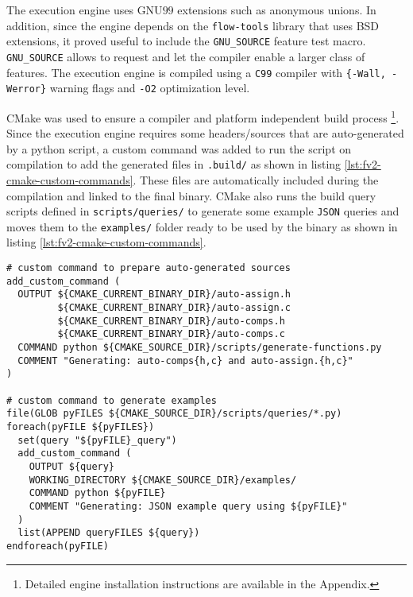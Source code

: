 The execution engine uses GNU$99$ extensions such as anonymous unions.  In
addition, since the engine depends on the \texttt{flow-tools} library that
uses BSD  extensions, it proved
useful to include the \texttt{GNU\_SOURCE} feature test macro.
\texttt{GNU\_SOURCE} allows to request and let the compiler enable a larger
class of features. The execution engine is compiled using a \texttt{C99}
compiler with \texttt{\{-Wall, -Werror\}} warning flags and \texttt{-O2}
optimization level.

CMake \cite{masteringcmake:2008} was used to ensure a compiler and platform
independent build process \footnote{Detailed engine installation instructions
are available in the Appendix.}.  Since the execution engine requires some
headers/sources that are auto-generated by a python script, a custom command
was added to run the script on compilation to add the generated files
 in \texttt{.build/} as shown in listing
\ref{lst:fv2-cmake-custom-commands}. These files are automatically included
during the compilation and linked to the final binary.  CMake also runs the
build query scripts defined in \texttt{scripts/queries/} to generate some
example \texttt{JSON} queries and moves them to the \texttt{examples/} folder
ready to be used by the binary as shown in listing
\ref{lst:fv2-cmake-custom-commands}.

\begin{lstlisting}
# custom command to prepare auto-generated sources
add_custom_command (
  OUTPUT ${CMAKE_CURRENT_BINARY_DIR}/auto-assign.h
         ${CMAKE_CURRENT_BINARY_DIR}/auto-assign.c
         ${CMAKE_CURRENT_BINARY_DIR}/auto-comps.h
         ${CMAKE_CURRENT_BINARY_DIR}/auto-comps.c
  COMMAND python ${CMAKE_SOURCE_DIR}/scripts/generate-functions.py
  COMMENT "Generating: auto-comps{h,c} and auto-assign.{h,c}"
)

# custom command to generate examples
file(GLOB pyFILES ${CMAKE_SOURCE_DIR}/scripts/queries/*.py)
foreach(pyFILE ${pyFILES})
  set(query "${pyFILE}_query")
  add_custom_command (
    OUTPUT ${query}
    WORKING_DIRECTORY ${CMAKE_SOURCE_DIR}/examples/
    COMMAND python ${pyFILE}
    COMMENT "Generating: JSON example query using ${pyFILE}"
  )
  list(APPEND queryFILES ${query})
endforeach(pyFILE)
\end{lstlisting}

